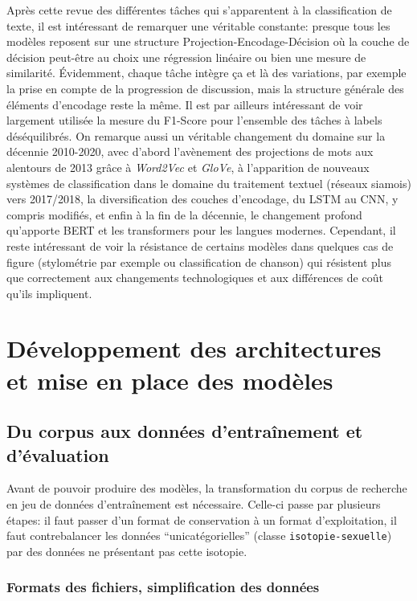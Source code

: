Après cette revue des différentes tâches qui s'apparentent à la classification de texte, il est intéressant de remarquer une véritable constante: presque tous les modèles reposent sur une structure Projection-Encodage-Décision où la couche de décision peut-être au choix une régression linéaire ou bien une mesure de similarité. Évidemment, chaque tâche intègre ça et là des variations, par exemple la prise en compte de la progression de discussion, mais la structure générale des éléments d'encodage reste la même. Il est par ailleurs intéressant de voir largement utilisée la mesure du F1-Score pour l'ensemble des tâches à labels déséquilibrés. On remarque aussi un véritable changement du domaine sur la décennie 2010-2020, avec  d'abord l'avènement des projections de mots aux alentours de 2013 grâce à \textit{Word2Vec} et \textit{GloVe}, à l'apparition de nouveaux systèmes de classification dans le domaine du traitement textuel (réseaux siamois) vers 2017/2018, la diversification des couches d'encodage, du LSTM au CNN, y compris modifiés, et enfin à la fin de la décennie, le changement profond qu'apporte BERT et les transformers pour les langues modernes. Cependant, il reste intéressant de voir la résistance de certains modèles dans quelques cas de figure (stylométrie par exemple ou classification de chanson) qui résistent plus que correctement aux changements technologiques et aux différences de coût qu'ils impliquent.



\section{Développement des architectures et mise en place des modèles}

\subsection{Du corpus aux données d'entraînement et d'évaluation}

Avant de pouvoir produire des modèles, la transformation du corpus de recherche en jeu de données d'entraînement est nécessaire. Celle-ci passe par plusieurs étapes: il faut passer d'un format de conservation à un format d'exploitation, il faut contrebalancer les données \enquote{unicatégorielles} (classe \texttt{isotopie-sexuelle}) par des données ne présentant pas cette isotopie.


\subsubsection{Formats des fichiers, simplification des données}

